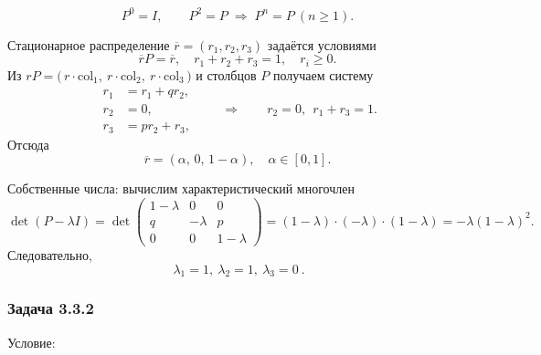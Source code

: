 \[
	P^0=I,\qquad P^2=P \;\Rightarrow\; P^n=P\ (n\ge1).
\]

Стационарное распределение $\overline r=(r_1,r_2,r_3)$ задаётся условиями
\[
	\overline r P = \overline r,\quad r_1+r_2+r_3=1,\quad r_i\ge0.
\]
Из $rP=\bigl(\,r\cdot\text{col}_1,\ r\cdot\text{col}_2,\ r\cdot\text{col}_3\,\bigr)$ и столбцов $P$ получаем систему
\[
	\begin{aligned}
		r_1 & = r_1 + q r_2, \\
		r_2 & = 0,           \\
		r_3 & = p r_2 + r_3,
	\end{aligned}
	\qquad\Rightarrow\qquad
	r_2=0,\ \ r_1+r_3=1.
\]
Отсюда
\[
	\overline r=(\alpha,\,0,\,1-\alpha),\quad \alpha\in[0,1].
\]

Собственные числа: вычислим характеристический многочлен
\[
	\det(P-\lambda I)=\det
	\begin{pmatrix}
		1-\lambda & 0        & 0         \\
		q         & -\lambda & p         \\
		0         & 0        & 1-\lambda
	\end{pmatrix}
	=(1-\lambda)\cdot(-\lambda)\cdot(1-\lambda)
	=-\lambda(1-\lambda)^2.
\]
Следовательно,
\[
	\boxed{\ \lambda_1=1,\ \lambda_2=1,\ \lambda_3=0\ }.
\]


\subsubsection*{Задача 3.3.2}

Условие:


